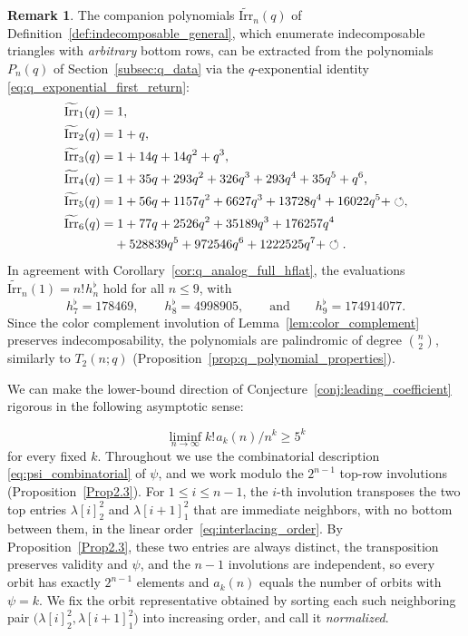 \documentclass[pdftex]{sigma}
\numberwithin{equation}{section}
\newcommand{\ssp}{\hspace{1pt}}
\theoremstyle{definition}
\newtheorem{Remark}[Theorem]{Remark}
\begin{document}
\begin{Remark}
	The companion polynomials $\widetilde{\mathrm{Irr}}_n(q)$ of
	Definition~\ref{def:indecomposable_general}, which enumerate indecomposable
	triangles with \emph{arbitrary} bottom rows, can be extracted from the
	polynomials $P_n(q)$ of Section~\ref{subsec:q_data} via the $q$-exponential
	identity \eqref{eq:q_exponential_first_return}:
	\begin{align*}
		&\widetilde{\mathrm{Irr}}_1(q)=1,\\
		&\widetilde{\mathrm{Irr}}_2(q)=1+q,\\
		&\widetilde{\mathrm{Irr}}_3(q)=1+14q+14q^2+q^3,\\
		&\widetilde{\mathrm{Irr}}_4(q)=1+35q+293q^2+326q^3+293q^4
		+35q^5+q^6,\\
		&\widetilde{\mathrm{Irr}}_5(q)=1+56q+1157q^2+6627q^3+13728q^4
		+16022q^5+\circlearrowleft,\\
		&\widetilde{\mathrm{Irr}}_6(q)=1+77q+2526q^2+35189q^3+176257q^4\\
&\hphantom{\widetilde{\mathrm{Irr}}_6(q)=}{}
		+528839q^5+972546q^6+1222525q^7+\circlearrowleft.
	\end{align*}
	In agreement with Corollary~\ref{cor:q_analog_full_hflat}, the evaluations
	$\widetilde{\mathrm{Irr}}_n(1)=n!\ssp h^\flat_n$ hold for all
	$n\le 9$, with
\[
h^\flat_7=178469 , \qquad h^\flat_8=4998905 , \qquad \text{and}\qquad h^\flat_9=174914077.
\]
Since the color complement involution of Lemma~\ref{lem:color_complement} preserves
indecomposability, the polynomials
 are palindromic of degree
$\binom{n}{2}$, similarly to $T_2(n;q)$ (Proposition~\ref{prop:q_polynomial_properties}).
\end{Remark}

We can make the lower-bound direction of Conjecture~\ref{conj:leading_coefficient}
rigorous in the following asymptotic sense:{\samepage
\[
\liminf_{n\to\infty}k!\ssp a_k(n)/n^{k}\ge 5^{k}
\] for every fixed $k$.
Throughout we use the combinatorial description \eqref{eq:psi_combinatorial} of
$\psi$, and we work modulo the $2^{n-1}$ top-row involutions
(Proposition~\ref{Prop2.3}). For $1\le i\le n-1$, the $i$-th involution
transposes the two top entries $\lambda[i]^2_2$ and $\lambda[i+1]^2_1$ that are
immediate neighbors, with no bottom between them, in the linear order~\eqref{eq:interlacing_order}. By Proposition~\ref{Prop2.3}, these two
entries are always distinct, the transposition preserves validity and $\psi$,
and the $n-1$ involutions are independent, so every orbit has exactly $2^{n-1}$
elements and $a_k(n)$ equals the number of orbits with $\psi=k$. We fix the
orbit representative obtained by sorting each such neighboring pair
$\bigl(\lambda[i]^2_2,\lambda[i+1]^2_1\bigr)$ into increasing order, and call it
\emph{normalized}.

}
\end{document}
